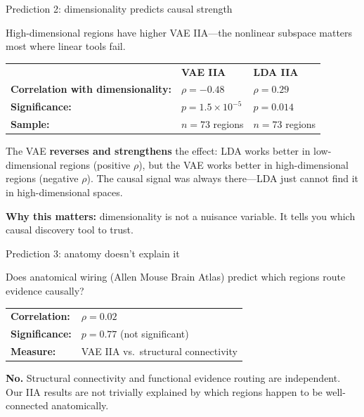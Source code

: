 \documentclass[aspectratio=169,11pt]{beamer}
\begin{document}
\begin{frame}{Prediction 2: dimensionality predicts causal strength}

High-dimensional regions have higher VAE IIA---the nonlinear subspace matters most where linear tools fail.

\vspace{0.4em}

\begin{center}
{\small
\begin{tabular}{lll}
& \textbf{VAE IIA} & \textbf{LDA IIA} \\[0.2em]
\textbf{Correlation with dimensionality:} & $\rho = -0.48$ & $\rho = 0.29$ \\[0.2em]
\textbf{Significance:} & $p = 1.5 \times 10^{-5}$ & $p = 0.014$ \\[0.2em]
\textbf{Sample:} & $n = 73$ regions & $n = 73$ regions \\
\end{tabular}
}
\end{center}

\vspace{0.4em}

The VAE \textbf{reverses and strengthens} the effect: LDA works better in low-dimensional regions (positive $\rho$), but the VAE works better in high-dimensional regions (negative $\rho$). The causal signal was always there---LDA just cannot find it in high-dimensional spaces.

\vspace{0.4em}
{\small \textbf{Why this matters:} dimensionality is not a nuisance variable. It tells you which causal discovery tool to trust.}
\end{frame}

\begin{frame}{Prediction 3: anatomy doesn't explain it}

Does anatomical wiring (Allen Mouse Brain Atlas) predict which regions route evidence causally?

\vspace{1em}

\begin{center}
\begin{tabular}{ll}
\textbf{Correlation:} & $\rho = 0.02$ \\[0.3em]
\textbf{Significance:} & $p = 0.77$ (not significant) \\[0.3em]
\textbf{Measure:} & VAE IIA vs.\ structural connectivity \\
\end{tabular}
\end{center}

\vspace{1em}

\textbf{No.} Structural connectivity and functional evidence routing are independent. Our IIA results are not trivially explained by which regions happen to be well-connected anatomically.

\end{frame}
\end{document}

